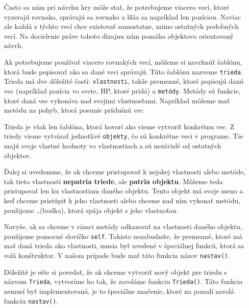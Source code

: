 





Často sa nám pri návrhu hry môže stať, že potrebujeme viacero vecí, ktoré vyzerajú rovnako, správajú
sa rovnako a líšia sa napríklad len pozíciou. Naviac ale každá z týchto vecí chce existovať
samostatne, mimo ostatných podobných vecí. Na docielenie práve tohoto dizajnu nám pomáha objektovo
orientovaný návrh.

Ak potrebujeme používať viacero rovnakých vecí, môžeme si navrhnúť šablónu, ktorá bude popisovať ako
sa dané veci správajú. Túto šablónu nazveme \texttt{trieda}. Trieda má dve dôležité časti:
\texttt{vlastnosti}, takže premenné, ktoré popisujú danú vec (napríklad pozícia vo svete, HP, ktoré
pridá) a \texttt{metódy}. Metódy sú funkcie, ktoré daná vec vykonáva nad svojimi vlastnosťami.
Napríklad môžeme mať metódu na pohyb, ktorá posunie príslušnú vec.

Trieda je však len šablóna, ktorá hovorí ako vieme vytvoriť konkrétnu vec. Z triedy vieme vytvárať
jednotlivé \texttt{objekty}, čo sú konkrétne veci v programe. Tie majú svoje vlastné hodnoty vo
vlastnostiach a sú nezávislé od ostatných objektov.

Ďalej si uvedomme, že ak chceme pristupovať k nejakej vlastnosti alebo metóde, tak tieto vlastnosti
\textbf{nepatria triede}, ale \textbf{patria objektu}. Môžeme teda pristupovať len ku vlastnostiam
daného objektu. Tento objekt má svoje meno a keď chceme pristúpiť k jeho vlastnosti alebo chceme nad
ním vykonať metódu, použijeme \texttt{.}(bodka), ktorá spája objekt s jeho vlastnoťou.

Navyše, ak sa chceme v rámci metódy odkazovať na vlastnosti daného objektu, použijeme pomocné slovíčko
\texttt{self}. Takisto nezabudnite, že premenné, ktoré má mať daná trieda ako vlastnosti, musia byť
uvedené v špeciálnej funkcii, ktorá sa volá konštruktor. V našom prípade bude mať táto funkcia názov
\texttt{nastav()}.

Dôležité je ešte si povedať, že ak chceme vytvoriť nový objekt pre triedu s názvom \texttt{Trieda},
vytvoríme ho tak, že zavoláme funkciu \texttt{Trieda()}. Táto funkcia nemusí byť implementovaná, je
to špeciálne značenie, ktoré na pozadí zavolá funkciu \texttt{nastav()}.

